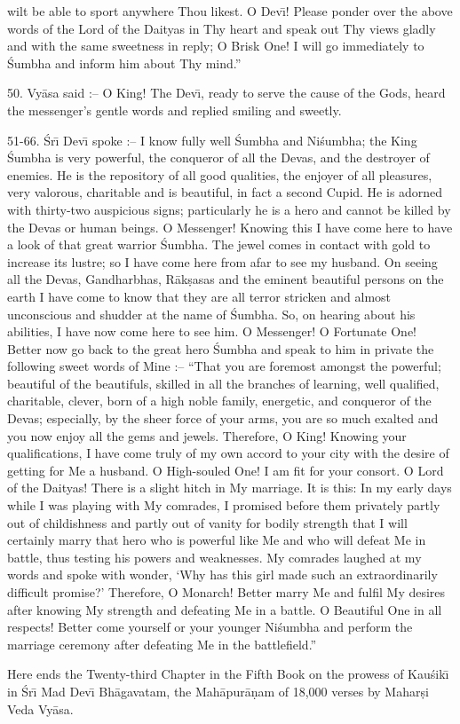 wilt be able to sport anywhere Thou likest. O Dev\={\i}! Please ponder over the above words of the Lord of the Daityas in Thy heart and speak out Thy views gladly and with the same sweetness in reply; O Brisk One! I will go immediately to \'Sumbha and inform him about Thy mind.''

50. Vy\=asa said :-- O King! The Dev\={\i}, ready to serve the cause of the Gods, heard the messenger's gentle words and replied smiling and sweetly.

51-66. \'Sr\={\i} Dev\={\i} spoke :-- I know fully well \'Sumbha and Ni\'sumbha; the King \'Sumbha is very powerful, the conqueror of all the Devas, and the destroyer of enemies. He is the repository of all good qualities, the enjoyer of all pleasures, very valorous, charitable and is beautiful, in fact a second Cupid. He is adorned with thirty-two auspicious signs; particularly he is a hero and cannot be killed by the Devas or human beings. O Messenger! Knowing this I have come here to have a look of that great warrior \'Sumbha. The jewel comes in contact with gold to increase its lustre; so I have come here from afar to see my husband. On seeing all the Devas, Gandharbhas, R\=ak\d{s}asas and the eminent beautiful persons on the earth I have come to know that they are all terror stricken and almost unconscious and shudder at the name of \'Sumbha. So, on hearing about his abilities, I have now come here to see him. O Messenger! O Fortunate One! Better now go back to the great hero \'Sumbha and speak to him in private the following sweet words of Mine :-- ``That you are foremost amongst the powerful; beautiful of the beautifuls, skilled in all the branches of learning, well qualified, charitable, clever, born of a high noble family, energetic, and conqueror of the Devas; especially, by the sheer force of your arms, you are so much exalted and you now enjoy all the gems and jewels. Therefore, O King! Knowing your qualifications, I have come truly of my own accord to your city with the desire of getting for Me a husband. O High-souled One! I am fit for your consort. O Lord of the Daityas! There is a slight hitch in My marriage. It is this: In my early days while I was playing with My comrades, I promised before them privately partly out of childishness and partly out of vanity for bodily strength that I will certainly marry that hero who is powerful like Me and who will defeat Me in battle, thus testing his powers and weaknesses. My comrades laughed at my words and spoke with wonder, `Why has this girl made such an extraordinarily difficult promise?' Therefore, O Monarch! Better marry Me and fulfil My desires after knowing My strength and defeating Me in a battle. O Beautiful One in all respects! Better come yourself or your younger Ni\'sumbha and perform the marriage ceremony after defeating Me in the battlefield.''

Here ends the Twenty-third Chapter in the Fifth Book on the prowess of Kau\'sik\={\i} in \'Sr\={\i} Mad Dev\={\i} Bh\=agavatam, the Mah\=apur\=a\d{n}am of 18,000 verses by Mahar\d{s}i Veda Vy\=asa.



